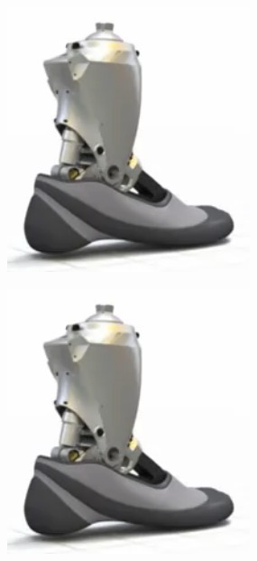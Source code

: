 \documentclass[10pt,fleqn]{article} %
\begin{document}
\begin{multicols}{2}
\begin{center}
\includegraphics[width=.48\textwidth]{images/prot_01}
\end{center}

\begin{center}
\includegraphics[width=.48\textwidth]{images/prot_01}
\end{center}

\fi

%
%
%


\end{multicols}
\end{document}
